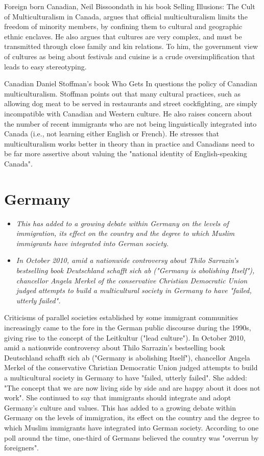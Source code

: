 Foreign born Canadian, Neil Bissoondath in his book Selling Illusions:
The Cult of Multiculturalism in Canada, argues that official
multiculturalism limits the freedom of minority members, by confining
them to cultural and geographic ethnic enclaves. He also argues that
cultures are very complex, and must be transmitted through close family
and kin relations. To him, the government view of cultures as being
about festivals and cuisine is a crude oversimplification that leads to
easy stereotyping.

Canadian Daniel Stoffman's book Who Gets In questions the policy of
Canadian multiculturalism. Stoffman points out that many cultural
practices, such as allowing dog meat to be served in restaurants and
street cockfighting, are simply incompatible with Canadian and Western
culture. He also raises concern about the number of recent immigrants
who are not being linguistically integrated into Canada (i.e., not
learning either English or French). He stresses that multiculturalism
works better in theory than in practice and Canadians need to be far
more assertive about valuing the "national identity of English-speaking
Canada".

\section{Germany}\label{germany}

\begin{itemize}
\item
  \emph{This has added to a growing debate within Germany on the levels
  of immigration, its effect on the country and the degree to which
  Muslim immigrants have integrated into German society.}
\item
  \emph{In October 2010, amid a nationwide controversy about Thilo
  Sarrazin's bestselling book Deutschland schafft sich ab ("Germany is
  abolishing Itself"), chancellor Angela Merkel of the conservative
  Christian Democratic Union judged attempts to build a multicultural
  society in Germany to have "failed, utterly failed".}
\end{itemize}

Criticisms of parallel societies established by some immigrant
communities increasingly came to the fore in the German public discourse
during the 1990s, giving rise to the concept of the Leitkultur ("lead
culture"). In October 2010, amid a nationwide controversy about Thilo
Sarrazin's bestselling book Deutschland schafft sich ab ("Germany is
abolishing Itself"), chancellor Angela Merkel of the conservative
Christian Democratic Union judged attempts to build a multicultural
society in Germany to have "failed, utterly failed". She added: "The
concept that we are now living side by side and are happy about it does
not work". She continued to say that immigrants should integrate and
adopt Germany's culture and values. This has added to a growing debate
within Germany on the levels of immigration, its effect on the country
and the degree to which Muslim immigrants have integrated into German
society. According to one poll around the time, one-third of Germans
believed the country was "overrun by foreigners".

